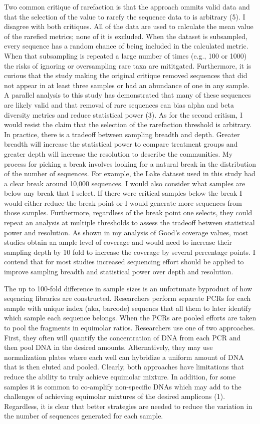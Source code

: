 \documentclass[
]{article}
\begin{document}
Two common critique of rarefaction is that the approach ommits valid
data and that the selection of the value to rarefy the sequence data to
is arbitrary (5). I disagree with both critiques. All of the data are
used to calculate the mean value of the rarefied metrics; none of it is
excluded. When the dataset is subsampled, every sequence has a random
chance of being included in the calculated metric. When that subsampling
is repeated a large number of times (e.g., 100 or 1000) the risks of
ignoring or oversampling rare taxa are mititgated. Furthermore, it is
curious that the study making the original critique removed sequences
that did not appear in at least three samples or had an abundance of one
in any sample. A parallel analysis to this study has demonstrated that
many of these sequences are likely valid and that removal of rare
sequences can bias alpha and beta diversity metrics and reduce
statistical power (3). As for the second critism, I would resist the
claim that the selection of the rarefaction threshold is arbitrary. In
practice, there is a tradeoff between sampling breadth and depth.
Greater breadth will increase the statistical power to compare treatment
groups and greater depth will increase the resolution to describe the
communities. My process for picking a break involves looking for a
natural break in the distribution of the number of sequences. For
example, the Lake dataset used in this study had a clear break around
10,000 sequences. I would also consider what samples are below any break
that I select. If there were critical samples below the break I would
either reduce the break point or I would generate more sequences from
those samples. Furthermore, regardless of the break point one selects,
they could repeat an analysis at multiple thresholds to assess the
tradeoff between statistical power and resolution. As shown in my
analysis of Good's coverage values, most studies obtain an ample level
of coverage and would need to increase their sampling depth by 10 fold
to increase the coverage by several percentage points. I contend that
for most studies increased sequencing effort should be applied to
improve sampling breadth and statistical power over depth and
resolution.

The up to 100-fold difference in sample sizes is an unfortunate
byproduct of how seqencing libraries are constructed. Researchers
perform separate PCRs for each sample with unique index (aka, barcode)
sequencs that all them to later identify which sample each sequence
belongs. When the PCRs are pooled efforts are taken to pool the
fragments in equimolar ratios. Researchers use one of two approaches.
First, they often will quantify the concentration of DNA from each PCR
and then pool DNA in the desired amounts. Alternatively, they may use
normalization plates where each well can hybridize a uniform amount of
DNA that is then eluted and pooled. Clearly, both approaches have
limitations that reduce the ability to truly achieve equimolar mixture.
In addition, for some samples it is common to co-amplify non-specific
DNAs which may add to the challenges of achieving equimolar mixtures of
the desired amplicons (1). Regardless, it is clear that better
strategies are needed to reduce the variation in the number of sequences
generated for each sample.
\end{document}
